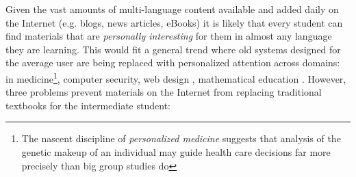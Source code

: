 

Given the vast amounts of multi-language content available and added daily on the Internet (e.g. blogs, news articles, eBooks) it is likely that every student can find materials that are {\em personally interesting} for them in almost any language they are learning. 
This would fit a general trend where old systems designed for the average user are being replaced with personalized attention across domains: in medicine\footnote{The nascent discipline of {\em personalized medicine} suggests that analysis of the genetic makeup of an individual may guide health care decisions far more precisely than big group studies do}, computer security,  web design \cite{Reinecke13-CulturalAdaptation}, mathematical education \cite{Polozov15-AdaptableMath}. 
% 
% 
% 
% 
% 
% 
% 
However, three problems prevent materials on the Internet from replacing traditional textbooks for the intermediate student:

